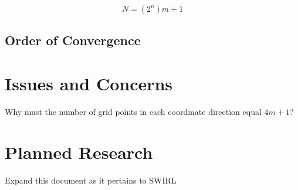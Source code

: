 \documentclass[a4paper]{article}
\begin{document}
\begin{equation}
    N = (2^n)m + 1
\end{equation}

\subsection{Order of Convergence}



\section{Issues and Concerns}
Why must the number of grid points in each coordinate direction equal $4m+1$?
\section{Planned Research}
Expand this document as it pertains to SWIRL
\end{document}
